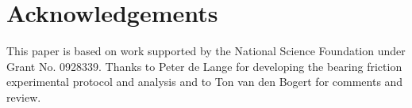 \documentclass[a4paper]{article}
\begin{document}
\section*{Acknowledgements}

This paper is based on work supported by the National Science Foundation under
Grant No. 0928339. Thanks to Peter de Lange for developing the bearing friction
experimental protocol and analysis and to Ton van den Bogert for comments and
review.



\end{document}
